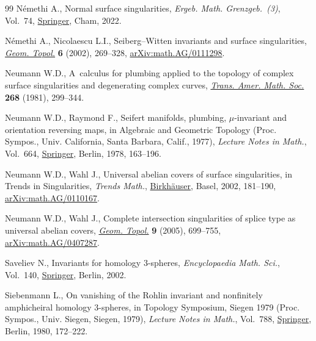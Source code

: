 \documentclass[pdftex]{sigma}
\begin{document}
\begin{thebibliography}{99}
N\'emethi A., Normal surface singularities, \textit{Ergeb. Math.
 Grenzgeb.~(3)}, Vol.~74,
 \href{https://doi.org/10.1007/978-3-031-06753-2}{Springer}, Cham, 2022.

N\'emethi A., Nicolaescu L.I., Seiberg--{W}itten invariants and surface
 singularities, \href{https://doi.org/10.2140/gt.2002.6.269}{\textit{Geom.
 Topol.}} \textbf{6} (2002), 269--328,
 \href{http://arxiv.org/abs/math.AG/0111298}{arXiv:math.AG/0111298}.

Neumann W.D., A~calculus for plumbing applied to the topology of complex
 surface singularities and degenerating complex curves,
 \href{https://doi.org/10.2307/1999331}{\textit{Trans. Amer. Math. Soc.}}
 \textbf{268} (1981), 299--344.

Neumann W.D., Raymond F., Seifert manifolds, plumbing, {$\mu $}-invariant and
 orientation reversing maps, in Algebraic and Geometric Topology ({P}roc.
 {S}ympos., {U}niv. {C}alifornia, {S}anta {B}arbara, {C}alif., 1977),
 \textit{Lecture Notes in Math.}, Vol.~664,
 \href{https://doi.org/10.1007/BFb0061699}{Springer}, Berlin, 1978, 163--196.

Neumann W.D., Wahl J., Universal abelian covers of surface singularities, in
 Trends in Singularities, \textit{Trends Math.},
 \href{https://doi.org/10.1007/978-3-0348-8161-6_8}{Birkh\"auser}, Basel,
 2002, 181--190,
 \href{http://arxiv.org/abs/math.AG/0110167}{arXiv:math.AG/0110167}.

Neumann W.D., Wahl J., Complete intersection singularities of splice type as
 universal abelian covers,
 \href{https://doi.org/10.2140/gt.2005.9.699}{\textit{Geom. Topol.}}
 \textbf{9} (2005), 699--755,
 \href{http://arxiv.org/abs/math.AG/0407287}{arXiv:math.AG/0407287}.

Saveliev N., Invariants for homology {$3$}-spheres, \textit{Encyclopaedia Math. Sci.}, Vol.~140,
 \href{https://doi.org/10.1007/978-3-662-04705-7}{Springer}, Berlin, 2002.

Siebenmann L., On vanishing of the {R}ohlin invariant and nonfinitely
 amphicheiral homology {$3$}-spheres, in Topology {S}ymposium, {S}iegen 1979
 ({P}roc. {S}ympos., {U}niv. {S}iegen, {S}iegen, 1979), \textit{Lecture Notes
 in Math.}, Vol.~788, \href{https://doi.org/10.1007/BFb0099246}{Springer},
 Berlin, 1980, 172--222.

\end{thebibliography}\LastPageEnding
\end{document}
